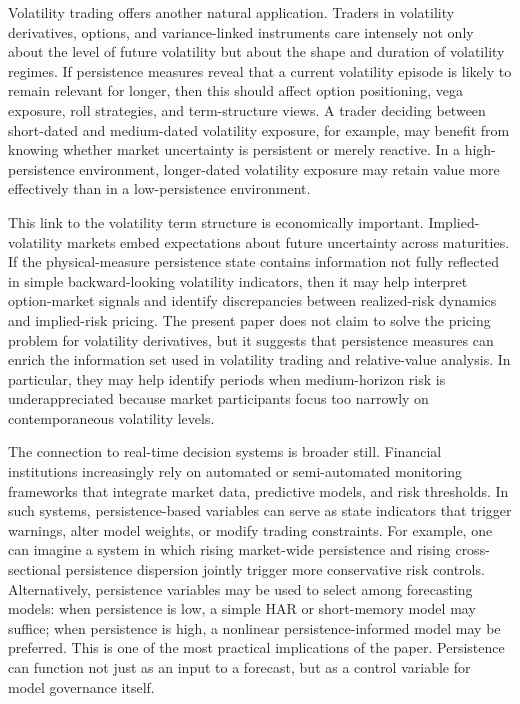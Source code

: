 \documentclass[12pt]{article}
\begin{document}
Volatility trading offers another natural application. Traders in volatility derivatives, options, and variance-linked instruments care intensely not only about the level of future volatility but about the shape and duration of volatility regimes. If persistence measures reveal that a current volatility episode is likely to remain relevant for longer, then this should affect option positioning, vega exposure, roll strategies, and term-structure views. A trader deciding between short-dated and medium-dated volatility exposure, for example, may benefit from knowing whether market uncertainty is persistent or merely reactive. In a high-persistence environment, longer-dated volatility exposure may retain value more effectively than in a low-persistence environment.

This link to the volatility term structure is economically important. Implied-volatility markets embed expectations about future uncertainty across maturities. If the physical-measure persistence state contains information not fully reflected in simple backward-looking volatility indicators, then it may help interpret option-market signals and identify discrepancies between realized-risk dynamics and implied-risk pricing. The present paper does not claim to solve the pricing problem for volatility derivatives, but it suggests that persistence measures can enrich the information set used in volatility trading and relative-value analysis. In particular, they may help identify periods when medium-horizon risk is underappreciated because market participants focus too narrowly on contemporaneous volatility levels.

The connection to real-time decision systems is broader still. Financial institutions increasingly rely on automated or semi-automated monitoring frameworks that integrate market data, predictive models, and risk thresholds. In such systems, persistence-based variables can serve as state indicators that trigger warnings, alter model weights, or modify trading constraints. For example, one can imagine a system in which rising market-wide persistence and rising cross-sectional persistence dispersion jointly trigger more conservative risk controls. Alternatively, persistence variables may be used to select among forecasting models: when persistence is low, a simple HAR or short-memory model may suffice; when persistence is high, a nonlinear persistence-informed model may be preferred. This is one of the most practical implications of the paper. Persistence can function not just as an input to a forecast, but as a control variable for model governance itself.
\end{document}
